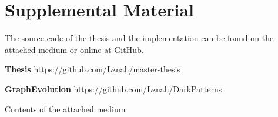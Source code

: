 \chapter{Supplemental Material}

The source code of the thesis and the implementation can be found on the attached medium or online at GitHub.

\noindent \textbf{Thesis} \hfill
    \url{https://github.com/Lznah/master-thesis}

\noindent \textbf{GraphEvolution} \hfill
    \url{https://github.com/Lznah/DarkPatterns}

\vfill

\begin{dirfigure}%
\caption{Contents of the attached medium}
\end{dirfigure}
